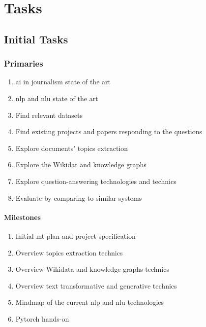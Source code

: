 \chapter{Tasks}
\label{chap:tasks}

\section{Initial Tasks}
\label{plan:initial-tasks}

\subsection{Primaries}
\begin{enumerate}
    \setlength\itemsep{0em}
    \item \gls{ai} in journalism state of the art
    \item \gls{nlp} and \gls{nlu} state of the art
    \item Find relevant datasets
    \item Find existing projects and papers responding to the questions
    \item Explore documents' topics extraction
    \item Explore the Wikidat and knowledge graphs
    \item Explore question-answering technologies and technics
    \item Evaluate by comparing to similar systems
\end{enumerate}
\subsubsection{Milestones}
\begin{enumerate}
    \setlength\itemsep{0em}
    \item Initial \gls{mt} plan and project specification
    \item Overview topics extraction technics
    \item Overview Wikidata and knowledge graphs technics
    \item Overview text transformative and generative technics
    \item Mindmap of the current \gls{nlp} and \gls{nlu} technologies
    \item Pytorch hands-on
\end{enumerate}

